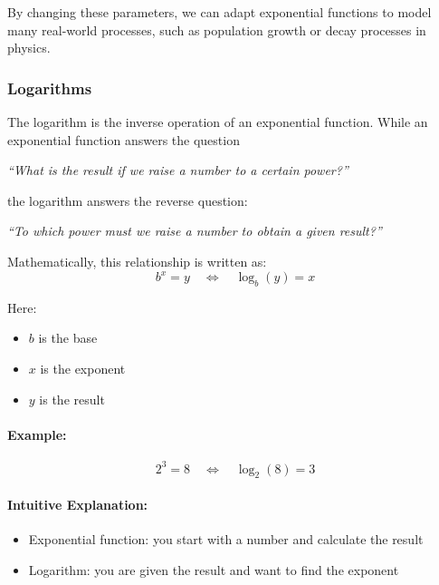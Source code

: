 By changing these parameters, we can adapt exponential functions to model many real-world processes, such as population growth or decay processes in physics.


\subsubsection{Logarithms}

The logarithm is the inverse operation of an exponential function. While an exponential function answers the question

\begin{center}
    \textit{``What is the result if we raise a number to a certain power?''}
\end{center}

the logarithm answers the reverse question:

\begin{center}
    \textit{``To which power must we raise a number to obtain a given result?''}
\end{center}

Mathematically, this relationship is written as:
\begin{equation}
    b^x = y \quad \Longleftrightarrow \quad \log_b(y) = x
\end{equation}

Here:
\begin{itemize}
    \item $b$ is the base
    \item $x$ is the exponent
    \item $y$ is the result
\end{itemize}

\paragraph{Example:}
\begin{equation}
    2^3 = 8 \quad \Longleftrightarrow \quad \log_2(8) = 3
\end{equation}

\paragraph{Intuitive Explanation:}
\begin{itemize}
    \item Exponential function: you start with a number and calculate the result
    \item Logarithm: you are given the result and want to find the exponent
\end{itemize}

